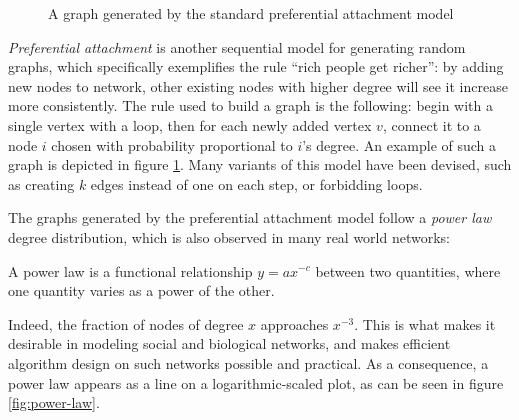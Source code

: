 \begin{figure}[ht]
    \centering
    \caption{A graph generated by the standard preferential attachment model}
    \label{fig:pref-att}
\end{figure}

\emph{Preferential attachment} is another sequential model for generating random graphs, which specifically exemplifies the rule ``rich people get richer'': by adding new nodes to network, other existing nodes with higher degree will see it increase more consistently. The rule used to build a graph is the following: begin with a single vertex with a loop, then for each newly added vertex $v$, connect it to a node $i$ chosen with probability proportional to $i$'s degree. An example of such a graph is depicted in figure \ref{fig:pref-att}. Many variants of this model have been devised, such as creating $k$ edges instead of one on each step, or forbidding loops.

The graphs generated by the preferential attachment model follow a \emph{power law} degree distribution, which is also observed in many real world networks: 

\begin{defn}
    A power law is a functional relationship $y = ax^{-c}$ between two quantities, where one quantity varies as a power of the other.
\end{defn}

Indeed, the fraction of nodes of degree $x$ approaches $x^{-3}$. This is what makes it desirable in modeling social and biological networks, and makes efficient algorithm design on such networks possible and practical. As a consequence, a power law appears as a line on a logarithmic-scaled plot, as can be seen in figure \ref{fig:power-law}.

